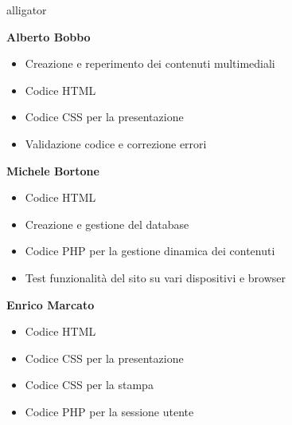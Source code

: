 \documentclass[10pt, a4paper]{article}
\begin{document}
\begin{labeling}{alligator}
	\item[\textbf{Alberto Bobbo}] \item[] %
		\begin{itemize}
			\item{Creazione e reperimento dei contenuti multimediali}
			\item{Codice HTML }
			\item{Codice CSS per la presentazione}
			\item{Validazione codice e correzione errori}
		\end{itemize}
	\item[\textbf{Michele Bortone}] \item[]
		\begin{itemize}
			\item{Codice HTML}
			\item{Creazione e gestione del database}
			\item{Codice PHP per la gestione dinamica dei contenuti}
			\item{Test funzionalità del sito su vari dispositivi e browser}
		\end{itemize}
	\item[\textbf{Enrico Marcato}] \item[]
		\begin{itemize}
			\item{Codice HTML }
			\item{Codice CSS per la presentazione}
			\item{Codice CSS per la stampa}
			\item{Codice PHP per la sessione utente   }
		\end{itemize}
\end{labeling}
\end{document}
